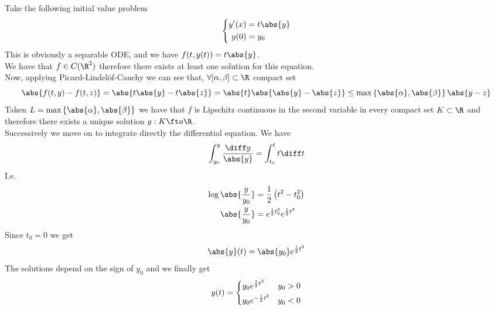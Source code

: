 \documentclass[../mmf.tex]{subfiles}
\begin{document}
\begin{eg}
	Take the following initial value problem
	\begin{equation*}
		\left\{ \begin{aligned}
				y'(x)&=t\abs{y}\\
				y(0)&=y_0
		\end{aligned}\right.
	\end{equation*}
	This is obviously a separable ODE, and we have $f(t,y(t))=t\abs{y}$.\\
	We have that $f\in C(\R^2)$ therefore there exists at least one solution for this equation.\\
	Now, applying Picard-Lindelöf-Cauchy we can see that, $\forall [\alpha,\beta]\subset\R$ compact set
	\begin{equation*}
		\abs{f(t,y)-f(t,z)}=\abs{t\abs{y}-t\abs{z}}=\abs{t}\abs{\abs{y}-\abs{z}}\le\max\left\{ \abs{\alpha},\abs{\beta} \right\}\abs{y-z}
	\end{equation*}
	Taken $L=\max\left\{ \abs{\alpha},\abs{\beta} \right\}$ we have that $f$ is Lipschitz continuous in the second variable in every compact set $K\subset\R$ and therefore there exists a unique solution $y:K\fto\R$.\\
	Successively we move on to integrate directly the differential equation. We have
	\begin{equation*}
		\int_{y_0}^{y}\frac{\diff y}{\abs{y}}=\int_{t_0}^{t}t\diff t
	\end{equation*}
	I.e.
	\begin{equation*}
		\begin{aligned}
			\log\abs{\frac{y}{y_0}}&=\frac{1}{2}\left( t^2-t_0^2 \right)\\
			\abs{\frac{y}{y_0}}&=e^{\frac{1}{2}t_0^2}e^{\frac{1}{2}t^2}
		\end{aligned}
	\end{equation*}
	Since $t_0=0$ we get
	\begin{equation*}
		\abs{y}(t)=\abs{y_0}e^{\frac{1}{2}t^2}
	\end{equation*}
	The solutions depend on the sign of $y_0$ and we finally get
	\begin{equation*}
		y(t)=\begin{dcases}y_0e^{\frac{1}{2}t^2}&y_0>0\\y_0e^{-\frac{1}{2}t^2}&y_0<0\end{dcases}
	\end{equation*}
\end{eg}
\end{document}

